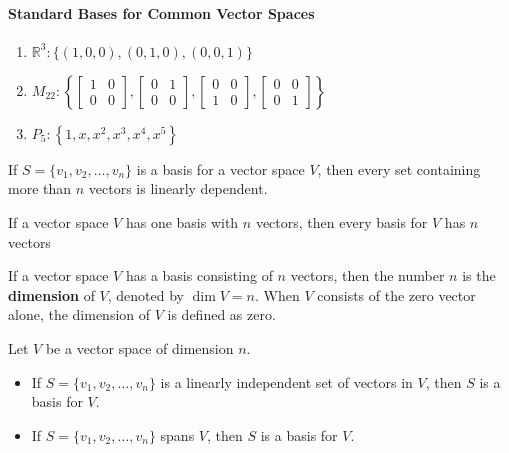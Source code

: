 \documentclass{report}
\begin{document}
\paragraph{Standard Bases for Common Vector Spaces}
\begin{enumerate}
	\item $\mathbb{R}^3: \{(1,0,0),(0,1,0),(0,0,1)\}$
	\item $M_{22}: \left\{ \begin{bmatrix} 1 & 0 \\ 0 & 0 \end{bmatrix}, \begin{bmatrix} 0 & 1 \\ 0 & 0 \end{bmatrix}, \begin{bmatrix} 0 & 0 \\ 1 & 0 \end{bmatrix}, \begin{bmatrix} 0 & 0 \\ 0 & 1 \end{bmatrix} \right\}$
	\item $ P_5: \left\{ 1, x, x^2, x^3, x^4, x^5\right\}$
\end{enumerate}

\begin{tcolorbox}[title = Bases and Linear Dependence]
	If $S=\{v_1,v_2,\hdots,v_n\}$ is a basis for a vector space $V$, then every set containing more than $n$ vectors is linearly dependent.
\end{tcolorbox}

\begin{tcolorbox}[title = Number of Vectors in a Basis]
		If a vector space $V$ has one basis with $n$ vectors, then every basis for $V$ has $n$ vectors
\end{tcolorbox}

\begin{tcolorbox}[title = Definition of the Dimension of a Vector Space]
		If a vector space $V$ has a basis consisting of $n$ vectors, then the number $n$ is the \textbf{dimension} of $V$, denoted by $\dim{V}=n$. When $V$ consists of the zero vector alone, the dimension of $V$ is defined as zero.
\end{tcolorbox}

\begin{tcolorbox}[title = Basis Test in an $n$-dimensional Space]
		Let $V$ be a vector space of dimension $n$. 
		\begin{itemize}
				\item If $S = \{v_1, v_2, \hdots, v_n\}$ is a linearly independent set of vectors in $V$, then $S$ is a basis for $V$.
				\item If $S = \{v_1, v_2, \hdots, v_n\}$ spans $V$, then $S$ is a basis for $V$.
		\end{itemize}
\end{tcolorbox}
\end{document}
